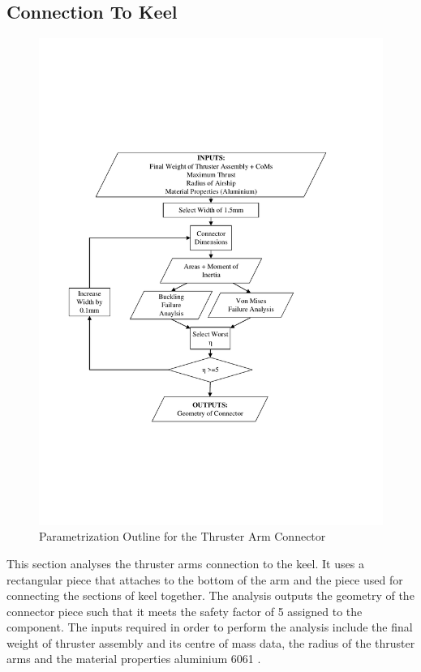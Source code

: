 \documentclass[../main.tex]{subfiles}
\begin{document}
\subsection{Connection To Keel} \label{connector}
\begin{figure}[H]
	\centering
	\includegraphics[width=.9\linewidth]{img/paramaterization/connector.pdf}
	\caption{Parametrization Outline for the Thruster Arm Connector}
	\label{fig:connectorParametrization}
\end{figure}

This section analyses the thruster arms connection to the keel. It uses a rectangular piece that attaches to the bottom of the arm and the piece used for connecting the sections of keel together. The analysis outputs the geometry of the connector piece such that it meets the safety factor of 5 assigned to the component. The inputs required in order to perform the analysis include the final weight of thruster assembly and its centre of mass data, the radius of the thruster arms and the material properties aluminium 6061 \cite{AlProperties}. 
\end{document}
